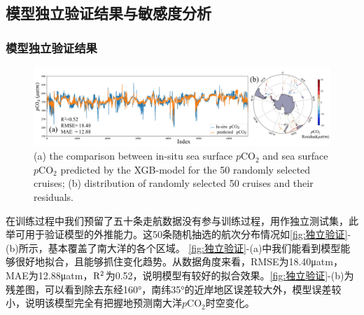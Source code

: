 \subsection{模型独立验证结果与敏感度分析}
\subsubsection{模型独立验证结果}
\begin{figure}[htbp]
    \centering
    \includegraphics[width=\linewidth]{figure/第三章用图/图3.3.jpg}
    {(a) the comparison between in-situ sea surface $p\mathrm{CO_2}$ and sea surface $p\mathrm{CO_2}$ predicted by the XGB-model for the 50 randomly selected cruises; (b) distribution of randomly selected 50 cruises and their residuals.}
\end{figure}

在训练过程中我们预留了五十条走航数据没有参与训练过程，用作独立测试集，此举可用于验证模型的外推能力。这50条随机抽选的航次分布情况如\autoref{fig:独立验证}-(b)所示，基本覆盖了南大洋的各个区域。 \autoref{fig:独立验证}-(a)中我们能看到模型能够很好地拟合，且能够抓住变化趋势。从数据角度来看，RMSE为18.40μatm，MAE为12.88μatm，$\rm R^2$为0.52，说明模型有较好的拟合效果。\autoref{fig:独立验证}-(b)为残差图，可以看到除去东经160°，南纬35°的近岸地区误差较大外，模型误差较小，说明该模型完全有把握地预测南大洋$p\mathrm{CO_2}$时空变化。


